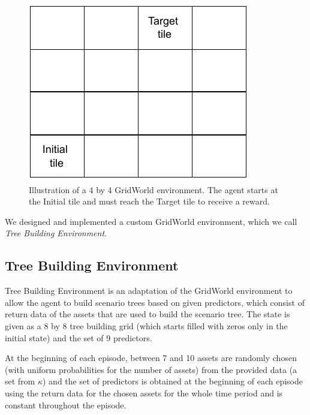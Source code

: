 \begin{figure}[H]
\centering
  \includegraphics[width=\linewidth / 3]{../img/gridworld_env_illustration.pdf}
  \caption{Illustration of a 4 by 4 GridWorld environment. The agent starts at the Initial tile and must reach the Target tile to receive a reward.}
  \label{fig:gridworldenv_illustration}
\end{figure}

We designed and implemented a custom GridWorld environment, which we call \textit{Tree Building Environment}.

\subsection{Tree Building Environment}
\label{section:treebuildingenv}
Tree Building Environment is an adaptation of the GridWorld environment to allow the agent to build scenario trees based on given predictors, which consist of return data of the assets that are used to build the scenario tree. 
The state is given as a 8 by 8 tree building grid (which starts filled with zeros only in the initial state) and the set of 9 predictors. 

At the beginning of each episode, between 7 and 10 assets are randomly chosen (with uniform probabilities for the number of assets) from the provided data (a set from $\kappa$) and the set of predictors is obtained at the beginning of each episode using the return data for the chosen assets for the whole time period and is constant throughout the episode. 

